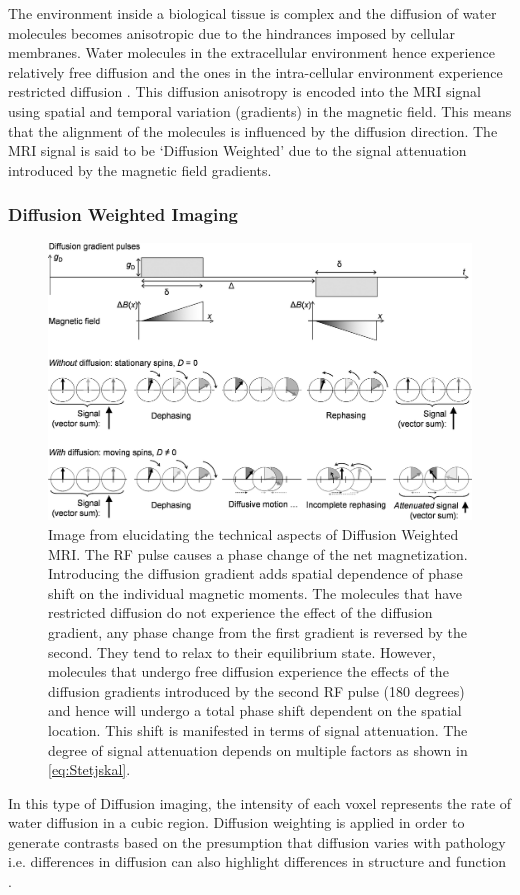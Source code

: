 \documentclass[msthesis.tex]{subfiles}
\begin{document}
The environment inside a biological tissue is complex and the diffusion of water molecules becomes anisotropic due to the hindrances imposed by cellular membranes. Water molecules in the extracellular environment hence experience relatively free diffusion and the ones in the intra-cellular environment experience restricted diffusion \citep{toennies2017guide}. This diffusion anisotropy is encoded into the MRI signal using spatial and temporal variation (gradients) in the magnetic field. This means that the alignment of the molecules is influenced by the diffusion direction. The \gls{MRI} signal is said to be `Diffusion Weighted' due to the signal attenuation introduced by the magnetic field gradients. 


\subsubsection{Diffusion Weighted Imaging}
\begin{figure}
    \centering
    \includegraphics[width=\textwidth]{images/diffusionmri.jpg}
    \caption{Image from \cite{technical_aspects_dmri} elucidating the technical aspects of Diffusion Weighted MRI. The RF pulse causes a phase change of the net magnetization. Introducing the diffusion gradient adds spatial dependence of phase shift on the individual magnetic moments. The molecules that have restricted diffusion do not experience the effect of the diffusion gradient, any phase change from the first gradient is reversed by the second. They tend to relax to their equilibrium state. However, molecules that undergo free diffusion experience the effects of the diffusion gradients introduced by the second RF pulse (180 degrees) and hence will undergo a total phase shift dependent on the spatial location. This shift is manifested in terms of signal attenuation. The degree of signal attenuation depends on multiple factors as shown in \autoref{eq:Stetjskal}.}
    \label{fig:diffmri}
\end{figure}
\label{sec:DWI}
In this type of Diffusion imaging, the intensity of each voxel represents the rate of water diffusion in a cubic region. Diffusion weighting is applied in order to generate contrasts based on the presumption that diffusion varies with pathology i.e. differences in diffusion can also highlight differences in structure and function \citep{Taylor_1985}. 
\end{document}
